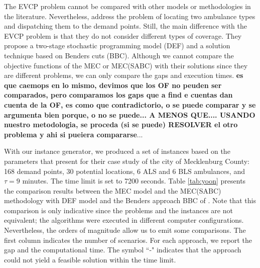 The EVCP problem cannot be compared with other models or methodologies in the literature. Nevertheless,  \cite{yoon2021stochastic} address the problem of locating two ambulance types and dispatching them to the demand points. Still, the main difference with the EVCP problem is that they do not consider different types of coverage. They propose a two-stage stochastic programming model (DEF) and a solution technique based on Benders cuts (BBC). Although we cannot compare the objective functions of the MEC or MEC(SABC) with their solutions since they are different problems, we can only compare the gaps and execution times. \textbf{es que caemops en lo mismo, devimos que los OF no peuden ser comparados, pero comparamos los gaps que a find e cuentas dan cuenta de la OF, es como que contradictorio, o se puede comparar y se argumenta bien porque, o no se puede... A MENOS QUE.... USANDO nuestro metodologia, se proceda (si se puede) RESOLVER el otro problema y ahi si pueiera compararse}... 

With our instance generator, we produced a set of instances based on the parameters that \cite{yoon2021stochastic} present for their case study of the city of Mecklenburg County: 168 demand points, 30 potential locations, 6 ALS and 6 BLS ambulances, and $\tau= 9$ minutes. The time limit is set to 7200 seconds. Table \ref{tab:yoon} presents the comparison results between the MEC model and the MEC(SABC) methodology with DEF model and the Benders approach BBC of \cite{yoon2021stochastic}. Note that this comparison is only indicative since the problems and the instances are not equivalent; the algorithms were executed in different computer configurations. Nevertheless, the orders of magnitude allow us to emit some comparisons. The first column indicates the number of scenarios. For each approach, we report the gap and the computational time. The symbol ``-" indicates that the approach could not yield a feasible solution within the time limit. 



